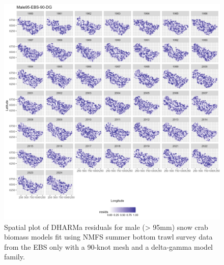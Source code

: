 \documentclass[
]{article}
\begin{document}
\begin{figure}

{\centering \includegraphics[width=1\linewidth,height=1\textheight]{../SNOW/Figures/DHARMa_Male95-EBS-90-DG_SPATIAL} 

}

\caption{Spatial plot of DHARMa residuals for male (> 95mm) snow crab biomass models fit using NMFS summer bottom trawl survey data from the EBS only with a 90-knot mesh and a delta-gamma model family.}\label{fig:snow-DHARMa-spat-90-male95-EBS}
\end{figure}
\end{document}
